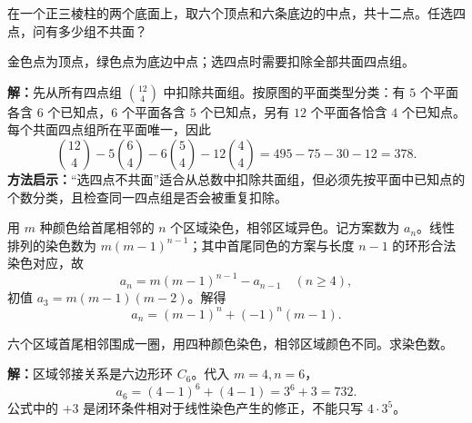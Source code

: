 \begin{examplebox}
  在一个正三棱柱的两个底面上，取六个顶点和六条底边的中点，共十二点。任选四点，问有多少组不共面？

  \begin{center}

  \smallskip
  金色点为顶点，绿色点为底边中点；选四点时需要扣除全部共面四点组。
  \end{center}

  \textbf{解：}先从所有四点组 $\binom{12}{4}$ 中扣除共面组。按原图的平面类型分类：有 $5$ 个平面各含 $6$ 个已知点，$6$ 个平面各含 $5$ 个已知点，另有 $12$ 个平面各恰含 $4$ 个已知点。每个共面四点组所在平面唯一，因此
  \[
    \binom{12}{4}-5\binom64-6\binom54-12\binom44
    =495-75-30-12=378.
  \]
  \textbf{方法启示：}“选四点不共面”适合从总数中扣除共面组，但必须先按平面中已知点的个数分类，且检查同一四点组是否会被重复扣除。
\end{examplebox}

\begin{lawbox}[环形相邻染色]
  用 $m$ 种颜色给首尾相邻的 $n$ 个区域染色，相邻区域异色。记方案数为 $a_n$。线性排列的染色数为 $m(m-1)^{n-1}$；其中首尾同色的方案与长度 $n-1$ 的环形合法染色对应，故
  \[
    a_n=m(m-1)^{n-1}-a_{n-1}\quad(n\ge4),
  \]
  初值 $a_3=m(m-1)(m-2)$。解得
  \[
    \boxed{a_n=(m-1)^n+(-1)^n(m-1)}.
  \]
\end{lawbox}

\begin{examplebox}
  六个区域首尾相邻围成一圈，用四种颜色染色，相邻区域颜色不同。求染色数。

  \begin{center}
  \end{center}

  \textbf{解：}区域邻接关系是六边形环 $C_6$。代入 $m=4,n=6$，
  \[
    a_6=(4-1)^6+(4-1)=3^6+3=732.
  \]
  公式中的 $+3$ 是闭环条件相对于线性染色产生的修正，不能只写 $4\cdot3^5$。
\end{examplebox}

